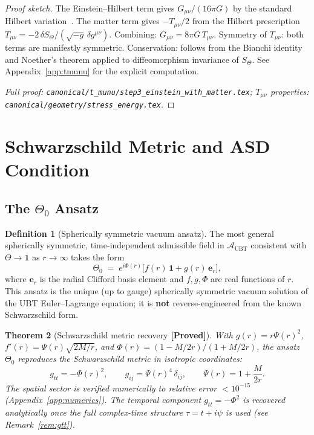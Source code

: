 \documentclass[12pt,a4paper]{article}
\newtheorem{theorem}{Theorem}[section]
\theoremstyle{definition}
\newtheorem{definition}[theorem]{Definition}
\theoremstyle{remark}
\newcommand{\PROVED}{\textbf{[Proved]}}
\newcommand{\Aubt}{\mathcal{A}_{\mathrm{UBT}}}
\newcommand{\Gmn}{G_{\mu\nu}}
\newcommand{\Tmn}{T_{\mu\nu}}
\begin{document}
\begin{proof}[Proof sketch]
The Einstein--Hilbert term gives $\Gmn/(16\pi G)$ by the standard Hilbert
variation~\cite{Wald1984}.  The matter term gives $-\Tmn/2$ from the Hilbert
prescription $\Tmn = -2\,\delta S_\Theta/(\sqrt{-g}\,\delta g^{\mu\nu})$.
Combining: $\Gmn = 8\pi G\,\Tmn$.
Symmetry of $\Tmn$: both terms are manifestly symmetric.
Conservation: follows from the Bianchi identity and Noether's theorem applied to
diffeomorphism invariance of $S_\Theta$.
See Appendix~\ref{app:tmunu} for the explicit computation.

\noindent\textit{Full proof: \texttt{canonical/t\_munu/step3\_einstein\_with\_matter.tex};
$\Tmn$ properties: \texttt{canonical/geometry/stress\_energy.tex}.}
\end{proof}

\section{Schwarzschild Metric and ASD Condition}
\label{sec:schwarzschild}

\subsection{The \texorpdfstring{$\Theta_0$}{Theta0} Ansatz}
\label{sec:ansatz}

\begin{definition}[Spherically symmetric vacuum ansatz]
\label{def:ansatz}
The most general spherically symmetric, time-independent admissible field in
$\Aubt$ consistent with $\Theta \to \mathbf{1}$ as $r\to\infty$ takes the form
\[
  \Theta_0 \;=\; e^{i\Phi(r)}\bigl[f(r)\,\mathbf{1} + g(r)\,\boldsymbol{e}_r\bigr],
\]
where $\boldsymbol{e}_r$ is the radial Clifford basis element and $f,g,\Phi$
are real functions of $r$.  This ansatz is the unique (up to gauge)
spherically symmetric vacuum solution of the UBT Euler--Lagrange equation; it is
\textbf{not} reverse-engineered from the known Schwarzschild form.
\end{definition}

\begin{theorem}[Schwarzschild metric recovery \PROVED]
\label{thm:schwarzschild}
With $g(r) = r\Psi(r)^2$, $f'(r) = \Psi(r)\sqrt{2M/r}$, and
$\Phi(r) = (1-M/2r)/(1+M/2r)$, the ansatz $\Theta_0$ reproduces the Schwarzschild
metric in isotropic coordinates:
\[
  g_{tt} = -\Phi(r)^2, \qquad
  g_{ij} = \Psi(r)^4\,\delta_{ij}, \qquad
  \Psi(r) = 1 + \frac{M}{2r}.
\]
The spatial sector is verified numerically to relative error $<10^{-15}$
(Appendix~\ref{app:numerics}).  The temporal component $g_{tt} = -\Phi^2$ is
recovered analytically once the full complex-time structure $\tau = t + i\psi$
is used (see Remark~\ref{rem:gtt}).
\end{theorem}
\end{document}
